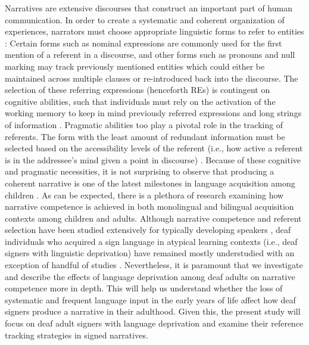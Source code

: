 \documentclass[review]{elsarticle} %
\begin{document}
Narratives are extensive discourses that construct an important part of
human communication. In order to create a systematic and coherent
organization of experiences, narrators must choose appropriate
linguistic forms to refer to entities
\citep{ariel1990, givon1983, gundel1993}: Certain forms such as nominal
expressions are commonly used for the first mention of a referent in a
discourse, and other forms such as pronouns and null marking may track
previously mentioned entities which could either be maintained across
multiple clauses or re-introduced back into the discourse. The selection
of these referring expressions (henceforth REs) is contingent on
cognitive abilities, such that individuals must rely on the activation
of the working memory to keep in mind previously referred expressions
and long strings of information \citep{morgan2005, bamberg1997}.
Pragmatic abilities too play a pivotal role in the tracking of
referents. The form with the least amount of redundant information must
be selected based on the accessibility levels of the referent (i.e., how
active a referent is in the addressee's mind given a point in discourse)
\citep{ahn2019, ariel1990}. Because of these cognitive and pragmatic
necessities, it is not surprising to observe that producing a coherent
narrative is one of the latest milestones in language acquisition among
children \citep{hickmann1996}. As can be expected, there is a plethora
of research examining how narrative competence is achieved in both
monolingual and bilingual acquisition contexts among children and
adults. Although narrative competence and referent selection have been
studied extensively for typically developing speakers
\citep{aksu-koc2015, hickmann1996, williams1988}, deaf individuals who
acquired a sign language in atypical learning contexts (i.e., deaf
signers with linguistic deprivation) have remained mostly understudied
with an exception of handful of studies
\citep{cormier2013, gur2018, becker2009}. Nevertheless, it is paramount
that we investigate and describe the effects of language deprivation
among deaf adults on narrative competence more in depth. This will help
us understand whether the loss of systematic and frequent language input
in the early years of life affect how deaf signers produce a narrative
in their adulthood. Given this, the present study will focus on deaf
adult signers with language deprivation and examine their reference
tracking strategies in signed narratives.
\end{document}
